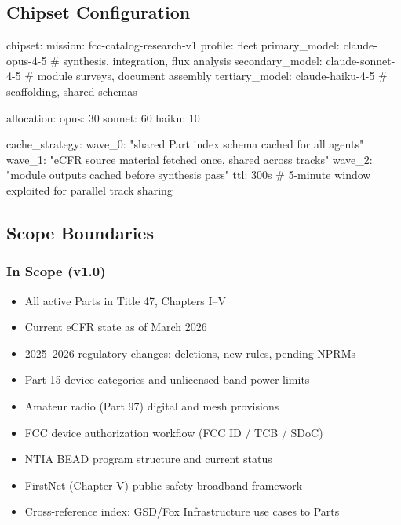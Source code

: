 \documentclass[11pt,letterpaper]{article}
\begin{document}
\subsection{Chipset Configuration}

\begin{asciibox}
chipset:
  mission: fcc-catalog-research-v1
  profile: fleet
  primary_model: claude-opus-4-5       # synthesis, integration, flux analysis
  secondary_model: claude-sonnet-4-5   # module surveys, document assembly
  tertiary_model: claude-haiku-4-5     # scaffolding, shared schemas

  allocation:
    opus:   30%
    sonnet: 60%
    haiku:  10%

  cache_strategy:
    wave_0: "shared Part index schema cached for all agents"
    wave_1: "eCFR source material fetched once, shared across tracks"
    wave_2: "module outputs cached before synthesis pass"
    ttl: 300s   # 5-minute window exploited for parallel track sharing
\end{asciibox}

\subsection{Scope Boundaries}

\subsubsection{In Scope (v1.0)}
\begin{itemize}[leftmargin=1.5em]
  \item All active Parts in Title 47, Chapters I--V
  \item Current eCFR state as of March 2026
  \item 2025--2026 regulatory changes: deletions, new rules, pending NPRMs
  \item Part 15 device categories and unlicensed band power limits
  \item Amateur radio (Part 97) digital and mesh provisions
  \item FCC device authorization workflow (FCC ID / TCB / SDoC)
  \item NTIA BEAD program structure and current status
  \item FirstNet (Chapter V) public safety broadband framework
  \item Cross-reference index: GSD/Fox Infrastructure use cases to Parts
\end{itemize}
\end{document}
